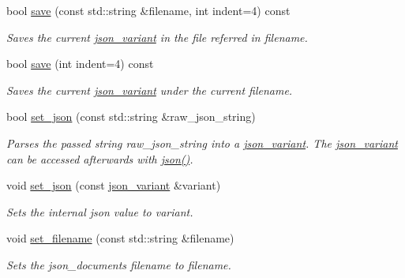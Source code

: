\begin{DoxyCompactItemize}
bool \hyperlink{classJSONLIB__NAMESPACE_1_1json__document_ab2e8c0baffe0ef93f3d3dc78b342453b}{save} (const std\+::string \&filename, int indent=4) const
\begin{DoxyCompactList}\small\item\em Saves the current \hyperlink{classJSONLIB__NAMESPACE_1_1json__variant}{json\+\_\+variant} in the file referred in {\ttfamily filename}. \end{DoxyCompactList}\item 
bool \hyperlink{classJSONLIB__NAMESPACE_1_1json__document_a861865e1aae02c2de80eb60a4a8bd668}{save} (int indent=4) const
\begin{DoxyCompactList}\small\item\em Saves the current \hyperlink{classJSONLIB__NAMESPACE_1_1json__variant}{json\+\_\+variant} under the current filename. \end{DoxyCompactList}\item 
bool \hyperlink{classJSONLIB__NAMESPACE_1_1json__document_a5a72e4dc0b37b95c70baefad930b5b71}{set\+\_\+json} (const std\+::string \&raw\+\_\+json\+\_\+string)
\begin{DoxyCompactList}\small\item\em Parses the passed string {\ttfamily raw\+\_\+json\+\_\+string} into a \hyperlink{classJSONLIB__NAMESPACE_1_1json__variant}{json\+\_\+variant}. The \hyperlink{classJSONLIB__NAMESPACE_1_1json__variant}{json\+\_\+variant} can be accessed afterwards with \hyperlink{classJSONLIB__NAMESPACE_1_1json__document_ad87b8e7d68ba854dbd730758273a3b93}{json()}. \end{DoxyCompactList}\item 
void \hyperlink{classJSONLIB__NAMESPACE_1_1json__document_ae6c52de0f1b1b6e5825f9555b6026e1b}{set\+\_\+json} (const \hyperlink{classJSONLIB__NAMESPACE_1_1json__variant}{json\+\_\+variant} \&variant)
\begin{DoxyCompactList}\small\item\em Sets the internal json value to {\ttfamily variant}. \end{DoxyCompactList}\item 
void \hyperlink{classJSONLIB__NAMESPACE_1_1json__document_acc406344661e361c75ac7bc307057712}{set\+\_\+filename} (const std\+::string \&filename)
\begin{DoxyCompactList}\small\item\em Sets the json\+\_\+documents {\itshape filename} to {\ttfamily filename}. \end{DoxyCompactList}\item 

\end{DoxyCompactItemize}
